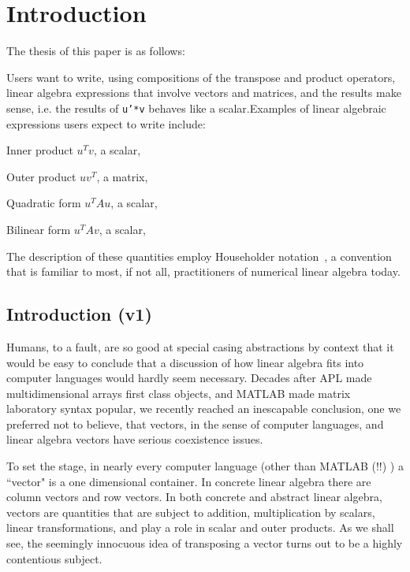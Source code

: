 \section{Introduction}

The thesis of this paper is as follows:

Users want to write, using compositions of the transpose and product operators, linear algebra expressions that involve vectors and matrices, and the results make sense, i.e. the results of \texttt{u'*v} behaves like a scalar.Examples of linear algebraic expressions users expect to write include:

\begin{description}

\item{Inner product} $u^T v$, a scalar,
\item{Outer product} $u v^T$, a matrix,
\item{Quadratic form} $u^T A u$, a scalar,
\item{Bilinear form} $u^T A v$, a scalar,

\end{description}

The description of these quantities employ Householder notation~\cite{Householder1953,Householder1955}, a convention that is familiar to most, if not all, practitioners of numerical linear algebra today.



\subsection{Introduction (v1)}

Humans, to a fault, are so good at special casing abstractions
by context that it would be easy to conclude that a discussion
of how linear algebra fits into computer languages would hardly
seem necessary.  Decades after APL made multidimensional
arrays first class objects, and MATLAB made matrix laboratory
syntax popular,  we recently  reached an inescapable conclusion,
one we preferred not to believe, that
vectors, in the sense of computer languages,
and linear algebra vectors have serious coexistence issues.



To set the stage, in nearly every computer language (other than MATLAB (!!) )
a ``vector"  is a one dimensional container.  In concrete
linear algebra there are column vectors and row vectors.
In  both concrete and abstract linear algebra, vectors are quantities that are subject
to addition, multiplication by scalars, linear transformations, and
play a role in scalar and outer products.
As we shall see, the  seemingly innocuous idea of transposing a vector turns out to be
a highly contentious subject.


